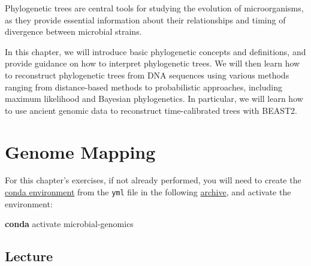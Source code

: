 \documentclass[
  letterpaper,
]{book}
\newenvironment{Shaded}{}{}
\newcommand{\ExtensionTok}[1]{\textcolor[rgb]{0.84,0.23,0.29}{\textbf{#1}}}
\newcommand{\NormalTok}[1]{\textcolor[rgb]{0.14,0.16,0.18}{#1}}
\begin{document}

Phylogenetic trees are central tools for studying the evolution of
microorganisms, as they provide essential information about their
relationships and timing of divergence between microbial strains.

In this chapter, we will introduce basic phylogenetic concepts and
definitions, and provide guidance on how to interpret phylogenetic
trees. We will then learn how to reconstruct phylogenetic trees from DNA
sequences using various methods ranging from distance-based methods to
probabilistic approaches, including maximum likelihood and Bayesian
phylogenetics. In particular, we will learn how to use ancient genomic
data to reconstruct time-calibrated trees with BEAST2.

\hypertarget{genome-mapping-1}{%
\chapter{Genome Mapping}\label{genome-mapping-1}}

\begin{tcolorbox}[enhanced jigsaw, opacitybacktitle=0.6, bottomtitle=1mm, opacityback=0, colback=white, coltitle=black, leftrule=.75mm, toprule=.15mm, title=\textcolor{quarto-callout-tip-color}{\faLightbulb}\hspace{0.5em}{Tip}, colframe=quarto-callout-tip-color-frame, toptitle=1mm, arc=.35mm, left=2mm, titlerule=0mm, breakable, rightrule=.15mm, bottomrule=.15mm, colbacktitle=quarto-callout-tip-color!10!white]

For this chapter's exercises, if not already performed, you will need to
create the \protect\hyperlink{creating-a-conda-environment}{conda
environment} from the \texttt{yml} file in the following
\href{https://doi.org/10.5281/zenodo.6983174}{archive}, and activate the
environment:

\begin{Shaded}
\begin{Highlighting}[]
\ExtensionTok{conda}\NormalTok{ activate microbial{-}genomics}
\end{Highlighting}
\end{Shaded}

\end{tcolorbox}

\hypertarget{lecture-12}{%
\section{Lecture}\label{lecture-12}}
\end{document}
